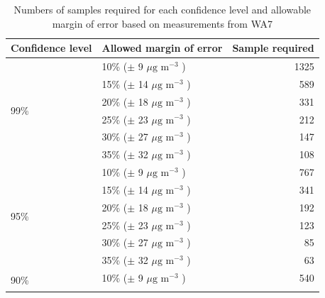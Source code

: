 \begin{table}[H]
\caption{Numbers of samples required for each confidence level and allowable margin of error based on measurements from WA7}
\centering
\begin{tabular}{|l|l|r|}
\hline
\textbf{Confidence level}     &            \textbf{Allowed margin of error}                            &        \textbf{Sample required}       \\
\hline
\multirow{6}{*}{99\%}   &            10\% ($\pm$ 9   $\mu \text{g m}^{-3}$ )    &        1325                  \\ \cline{2-3} 
                        &            15\% ($\pm$ 14  $\mu \text{g m}^{-3}$ )    &        589                   \\ \cline{2-3} 
                        &            20\% ($\pm$ 18  $\mu \text{g m}^{-3}$ )    &        331                   \\ \cline{2-3}
                        &            25\% ($\pm$ 23  $\mu \text{g m}^{-3}$ )    &        212                   \\ \cline{2-3}
                        &            30\% ($\pm$ 27  $\mu \text{g m}^{-3}$ )    &        147                   \\ \cline{2-3}
                        &            35\% ($\pm$ 32  $\mu \text{g m}^{-3}$ )    &        108                   \\ \hline
\multirow{6}{*}{95\%}   &            10\% ($\pm$ 9   $\mu \text{g m}^{-3}$ )    &        767                   \\ \cline{2-3} 
                        &            15\% ($\pm$ 14  $\mu \text{g m}^{-3}$ )    &        341                   \\ \cline{2-3} 
                        &            20\% ($\pm$ 18  $\mu \text{g m}^{-3}$ )    &        192                   \\ \cline{2-3} 
                        &            25\% ($\pm$ 23  $\mu \text{g m}^{-3}$ )    &        123                   \\ \cline{2-3} 
                        &            30\% ($\pm$ 27  $\mu \text{g m}^{-3}$ )    &        85                    \\ \cline{2-3} 
                        &            35\% ($\pm$ 32  $\mu \text{g m}^{-3}$ )    &        63                    \\ \hline
\multirow{6}{*}{90\%}   &            10\% ($\pm$ 9   $\mu \text{g m}^{-3}$ )    &        540                   \\ \cline{2-3} 

\end{tabular}
\end{table}
